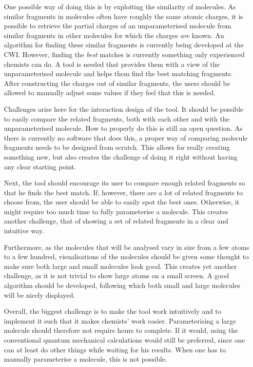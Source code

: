 One possible way of doing this is by exploiting the similarity of molecules. As similar fragments in molecules often have roughly the same atomic charges, it is possible to retrieve the partial charges of an unparameterised molecule from similar fragments in other molecules for which the charges \emph{are} known. An algorithm for finding these similar fragments is currently being developed at the CWI. However, finding the \emph{best} matches is currently something only experienced chemists can do. A tool is needed that provides them with a view of the unparameterised molecule and helps them find the best matching fragments. After constructing the charges out of similar fragments, the users should be allowed to manually adjust some values if they feel that this is needed.

Challenges arise here for the interaction design of the tool. It should be possible to easily compare the related fragments, both with each other and with the unparameterised molecule. How to properly do this is still an open question. As there is currently no software that does this, a proper way of comparing molecule fragments needs to be designed from scratch. This allows for really creating something new, but also creates the challenge of doing it right without having any clear starting point.

Next, the tool should encourage its user to compare enough related fragments so that he finds the best match. If, however, there are a lot of related fragments to choose from, the user should be able to easily spot the best ones. Otherwise, it might require too much time to fully parameterise a molecule. This creates another challenge, that of showing a set of related fragments in a clear and intuitive way.

Furthermore, as the molecules that will be analysed vary in size from a few atoms to a few hundred, visualisations of the molecules should be given some thought to make sure both large and small molecules look good. This creates yet another challenge, as it is not trivial to show large atoms on a small screen. A good algorithm should be developed, following which both small and large molecules will be nicely displayed.

Overall, the biggest challenge is to make the tool work intuitively and to implement it such that it makes chemists' work easier. Parameterising a large molecule should therefore not require hours to complete. If it would, using the conventional quantum mechanical calculations would still be preferred, since one can at least do other things while waiting for his results. When one has to manually parameterise a molecule, this is not possible.
